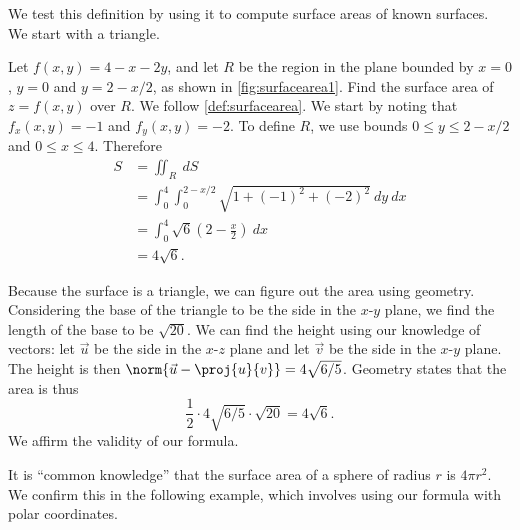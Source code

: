 
We test this definition by using it to compute surface areas of known surfaces. We start with a triangle.

\begin{example}\label{ex_surfacearea1}
Let $f(x,y) = 4-x-2y$, and let $R$ be the region in the plane bounded by $x=0$, $y=0$ and $y=2-x/2$, as shown in \autoref{fig:surfacearea1}. Find the surface area of $z=f(x,y)$ over $R$.
%
%
\solution
We follow \autoref{def:surfacearea}. We start by noting that $f_x(x,y) = -1$ and $f_y(x,y) = -2$. To define $R$, we use bounds $0\leq y\leq 2-x/2$ and $0\leq x\leq 4$. Therefore
\begin{align*}
S &= \iint_R\ dS \\
  &= \int_0^4\int_0^{2-x/2} \sqrt{1+(-1)^2+(-2)^2}\ dy\ dx\\
	&= \int_0^4 \sqrt{6}\left(2-\frac x2\right)\ dx\\
	&= 4\sqrt{6}.
\end{align*}

Because the surface is a triangle, we can figure out the area using geometry. Considering the base of the triangle to be the side in the $x$-$y$ plane, we find the length of the base to be $\sqrt{20}$. We can find the height using our knowledge of vectors: let $\vec u$ be the side in the $x$-$z$ plane  and let $\vec v$ be the side in the $x$-$y$ plane. The height is then $\norm {\vec u - \proj{u}{v}} = 4\sqrt{6/5}$. Geometry states that the area is thus
\[\frac 12\cdot4\sqrt{6/5}\cdot\sqrt{20} = 4\sqrt{6}.\]
We affirm the validity of our formula.
\end{example}

It is ``common knowledge'' that the surface area of a sphere of radius $r$ is $4\pi r^2$. We confirm this in the following example, which involves using our formula with polar coordinates.

